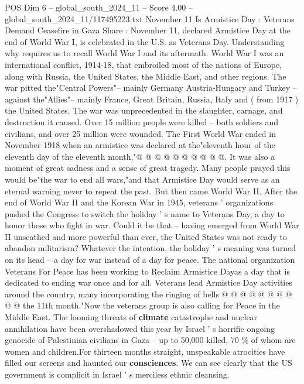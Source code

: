\begin{textsample}{POS Dim 6 – global\_south\_2024\_11 – Score 4.00 – global\_south\_2024\_11/117495223.txt}  \label{ex:f6_pos_337}
November 11 Is Armistice Day : Veterans Demand Ceasefire in Gaza Share : November 11, declared Armistice Day at the end of World War I, is celebrated in the U.S. as Veterans Day.
Understanding why requires us to recall World War I and its aftermath.
World War I was an international conflict, 1914-18, that embroiled most of the nations of Europe, along with Russia, the United States, the Middle East, and other regions.
The war pitted the"Central Powers"-- mainly Germany Austria-Hungary and Turkey -- against the"Allies"-- mainly France, Great Britain, Russia, Italy and ( from 1917 ) the United States.
The war was unprecedented in the slaughter, carnage, and destruction it caused.
Over 15 million people were killed -- both soldiers and civilians, and over 25 million were wounded.
The First World War ended in November 1918 when an armistice was declared at the"eleventh hour of the eleventh day of the eleventh month,"@ @ @ @ @ @ @ @ @ @.
It was also a moment of great sadness and a sense of great tragedy.
Many people prayed this would be"the war to end all wars,"and that Armistice Day would serve as an eternal warning never to repeat the past.
But then came World War II.
After the end of World War II and the Korean War in 1945, veterans ' organizations pushed the Congress to switch the holiday ' s name to Veterans Day, a day to honor those who fight in war.
Could it be that -- having emerged from World War II unscathed and more powerful than ever, the United States was not ready to abandon militarism?
Whatever the intention, the holiday ' s meaning was turned on its head -- a day for war instead of a day for peace.
The national organization Veterans For Peace has been working to Reclaim Armistice Dayas a day that is dedicated to ending war once and for all.
Veterans lead Armistice Day activities around the country, many incorporating the ringing of bells @ @ @ @ @ @ @ @ @ @ the 11th month."Now the veterans group is also calling for Peace in the Middle East.
The looming threats of \textbf{climate} catastrophe and nuclear annihilation have been overshadowed this year by Israel ' s horrific ongoing genocide of Palestinian civilians in Gaza -- up to 50,000 killed, 70 \% of whom are women and children.For thirteen months straight, unspeakable atrocities have filled our screens and haunted our \textbf{consciences}.
We can see clearly that the US government is complicit in Israel ' s merciless ethnic cleansing.

\end{textsample}

